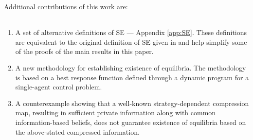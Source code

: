 \documentclass[pdflatex,sn-basic]{sn-jnl}
\theoremstyle{thmstyleone}%
\theoremstyle{thmstyletwo}%
\theoremstyle{thmstylethree}%
\begin{document}
    Additional contributions of this work are:\\~


\begin{enumerate}
    \item A set of alternative definitions of SE --- Appendix \ref{app:SE}. These definitions are equivalent to the original definition of SE given in \cite{kreps1982sequential} and help simplify some of the proofs of the main results in this paper.

    \item A new methodology for establishing existence of equilibria. The methodology is based on a best response function defined through a dynamic program for a single-agent control problem.

    \item A counterexample showing that a well-known strategy-dependent compression map, resulting in sufficient private information along with common information-based beliefs, does not guarantee existence of equilibria based on the above-stated compressed information.

\end{enumerate}
\end{document}
